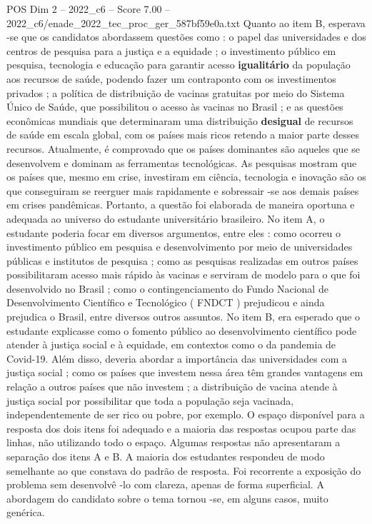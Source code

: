 \begin{textsample}{POS Dim 2 – 2022\_c6 – Score 7.00 – 2022\_c6/enade\_2022\_tec\_proc\_ger\_587bf59e0a.txt}
Quanto ao item B, esperava -se que os candidatos abordassem questões como : o papel das universidades e dos centros de pesquisa para a justiça e a equidade ; o investimento público em pesquisa, tecnologia e educação para garantir acesso \textbf{igualitário} da população aos recursos de saúde, podendo fazer um contraponto com os investimentos privados ; a política de distribuição de vacinas gratuitas por meio do Sistema Único de Saúde, que possibilitou o acesso às vacinas no Brasil ; e as questões econômicas mundiais que determinaram uma distribuição \textbf{desigual} de recursos de saúde em escala global, com os países mais ricos retendo a maior parte desses recursos.
Atualmente, é comprovado que os países dominantes são aqueles que se desenvolvem e dominam as ferramentas tecnológicas.
As pesquisas mostram que os países que, mesmo em crise, investiram em ciência, tecnologia e inovação são os que conseguiram se reerguer mais rapidamente e sobressair -se aos demais países em crises pandêmicas.
Portanto, a questão foi elaborada de maneira oportuna e adequada ao universo do estudante universitário brasileiro.
No item A, o estudante poderia focar em diversos argumentos, entre eles : como ocorreu o investimento público em pesquisa e desenvolvimento por meio de universidades públicas e institutos de pesquisa ; como as pesquisas realizadas em outros países possibilitaram acesso mais rápido às vacinas e serviram de modelo para o que foi desenvolvido no Brasil ; como o contingenciamento do Fundo Nacional de Desenvolvimento Científico e Tecnológico ( FNDCT ) prejudicou e ainda prejudica o Brasil, entre diversos outros assuntos.
No item B, era esperado que o estudante explicasse como o fomento público ao desenvolvimento científico pode atender à justiça social e à equidade, em contextos como o da pandemia de Covid-19.
Além disso, deveria abordar a importância das universidades com a justiça social ; como os países que investem nessa área têm grandes vantagens em relação a outros países que não investem ; a distribuição de vacina atende à justiça social por possibilitar que toda a população seja vacinada, independentemente de ser rico ou pobre, por exemplo.
O espaço disponível para a resposta dos dois itens foi adequado e a maioria das respostas ocupou parte das linhas, não utilizando todo o espaço.
Algumas respostas não apresentaram a separação dos itens A e B.
A maioria dos estudantes respondeu de modo semelhante ao que constava do padrão de resposta.
Foi recorrente a exposição do problema sem desenvolvê -lo com clareza, apenas de forma superficial.
A abordagem do candidato sobre o tema tornou -se, em alguns casos, muito genérica.

\end{textsample}
